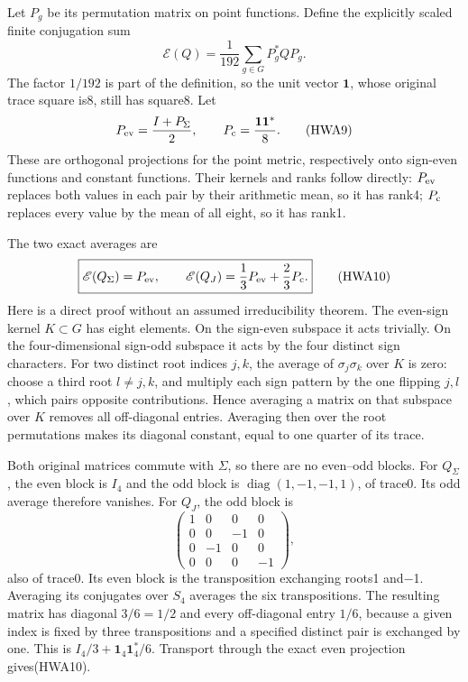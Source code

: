 \documentclass[
  10pt,
  a4paper,
]{article}
\begin{document}
Let \(P_g\) be its permutation matrix on point functions. Define the
explicitly scaled finite conjugation sum \[
\mathscr E(Q)=\frac1{192}\sum_{g\in G}P_g^*QP_g.
\tag{HWA8}
\] The factor \(1/192\) is part of the definition, so the unit vector
\(\mathbf1\), whose original trace square is8, still has square8. Let \[
P_{\rm ev}=\frac{I+P_\Sigma}{2},\qquad
P_{\rm c}=\frac{\mathbf1\mathbf1^*}{8}.
\tag{HWA9}
\] These are orthogonal projections for the point metric, respectively
onto sign-even functions and constant functions. Their kernels and ranks
follow directly: \(P_{\rm ev}\) replaces both values in each pair by
their arithmetic mean, so it has rank4; \(P_{\rm c}\) replaces every
value by the mean of all eight, so it has rank1.

The two exact averages are \[
\boxed{\mathscr E(Q_\Sigma)=P_{\rm ev},\qquad
\mathscr E(Q_J)=\frac13P_{\rm ev}+\frac23P_{\rm c}.}
\tag{HWA10}
\] Here is a direct proof without an assumed irreducibility theorem. The
even-sign kernel \(K\subset G\) has eight elements. On the sign-even
subspace it acts trivially. On the four-dimensional sign-odd subspace it
acts by the four distinct sign characters. For two distinct root indices
\(j,k\), the average of \(\sigma_j\sigma_k\) over \(K\) is zero: choose
a third root \(l\ne j,k\), and multiply each sign pattern by the one
flipping \(j,l\), which pairs opposite contributions. Hence averaging a
matrix on that subspace over \(K\) removes all off-diagonal entries.
Averaging then over the root permutations makes its diagonal constant,
equal to one quarter of its trace.

Both original matrices commute with \(\Sigma\), so there are no
even--odd blocks. For \(Q_\Sigma\), the even block is \(I_4\) and the
odd block is \(\operatorname{diag}(1,-1,-1,1)\), of trace0. Its odd
average therefore vanishes. For \(Q_J\), the odd block is \[
\begin{pmatrix}1&0&0&0\\0&0&-1&0\\0&-1&0&0\\0&0&0&-1\end{pmatrix},
\tag{HWA11}
\] also of trace0. Its even block is the transposition exchanging roots1
and−1. Averaging its conjugates over \(S_4\) averages the six
transpositions. The resulting matrix has diagonal \(3/6=1/2\) and every
off-diagonal entry \(1/6\), because a given index is fixed by three
transpositions and a specified distinct pair is exchanged by one. This
is \(I_4/3+\mathbf1_4\mathbf1_4^*/6\). Transport through the exact even
projection gives(HWA10).
\end{document}
